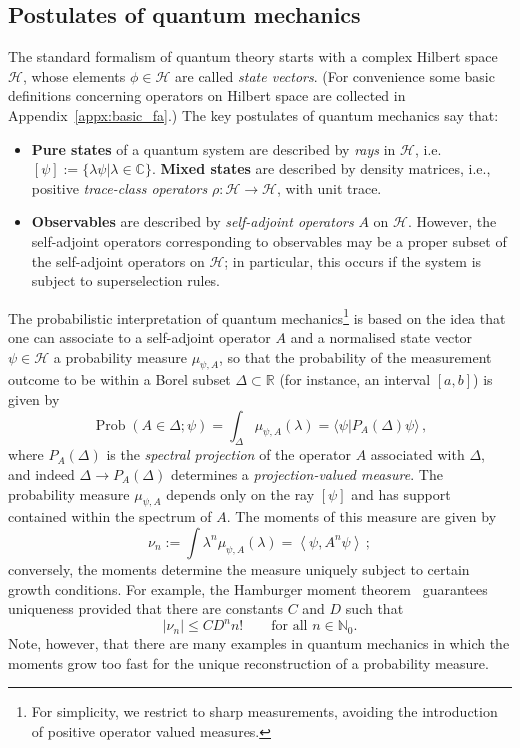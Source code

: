 \documentclass[12pt,a4paper]{article}
\newcommand{\1}{\mathds{1}}                         %
\newcommand{\NN}{\mathbb{N}}          %
\newcommand{\RR}{\mathbb{R}}           %
\newcommand{\Hcal}{\mathcal {H}}
\newcommand{\C}{\mathbb{C}}
\newcommand{\ip}[2]{\langle #1|#2\rangle}
\DeclareMathOperator{\Prob}{Prob}
\begin{document}
\subsection{Postulates of quantum mechanics}\label{sec:PosQM}
The standard formalism of quantum theory starts with a complex Hilbert space $\Hcal$, whose elements $\phi\in\Hcal$ are called \textit{state vectors}. (For convenience some basic definitions concerning operators on Hilbert space are collected in Appendix~\ref{appx:basic_fa}.)
The key postulates of quantum mechanics say that:
\begin{itemize}
\item \textbf{Pure states} of a quantum system are described by \textit{rays} in $\Hcal$, i.e. $[\psi]:=\{\lambda \psi|\lambda\in\C\}$. \textbf{Mixed states} are described by density matrices, i.e., positive \textit{trace-class operators} $\rho:\Hcal\rightarrow\Hcal$, with unit trace. 
\item \textbf{Observables} are described by \textit{self-adjoint operators} $A$ on $\Hcal$. However, the self-adjoint operators corresponding to observables may be a proper subset of the self-adjoint operators on $\Hcal$; in particular, this occurs if the system is subject to superselection rules.
\end{itemize}


The probabilistic interpretation of quantum mechanics\footnote{For simplicity, we restrict to sharp measurements, avoiding the introduction of positive operator valued measures.} is based on the idea that one can associate to a self-adjoint operator $A$ and a normalised state vector $\psi\in\Hcal$ a probability measure $\mu_{\psi,A}$, so that the probability of the measurement outcome to be within a Borel subset $\Delta\subset\RR$ (for instance, an interval $[a,b]$) is given by 
\[
\Prob(A\in\Delta;\psi)=\int_\Delta\mu_{\psi,A}(\lambda)= \ip{\psi}{P_{A}(\Delta)\psi}\,,
\]
where $P_{A}(\Delta)$ is the \emph{spectral projection} of the operator $A$ associated with $\Delta$, and indeed $\Delta\to P_{A}(\Delta)$ determines a \emph{projection-valued measure}. The probability measure $\mu_{\psi,A}$ depends only on the ray $[\psi]$ and has support contained within the spectrum of $A$. 
The moments of this measure are given by
\[
\nu_n:=\int \lambda^n\mu_{\psi,A}(\lambda)= \left<\psi,A^n\psi\right>\,;
\] 
conversely, the moments determine the measure uniquely subject to certain growth conditions. For example, the Hamburger moment theorem~\cite{Simon:1998} guarantees uniqueness provided that there are constants $C$ and $D$ such that
\begin{equation}
|\nu_n|\le C D^n n!\qquad\text{for all $n\in\NN_0$.}
\end{equation} 
Note, however, that
there are many examples in quantum mechanics in which the moments grow too fast for the unique reconstruction of a probability measure. 
\end{document}
